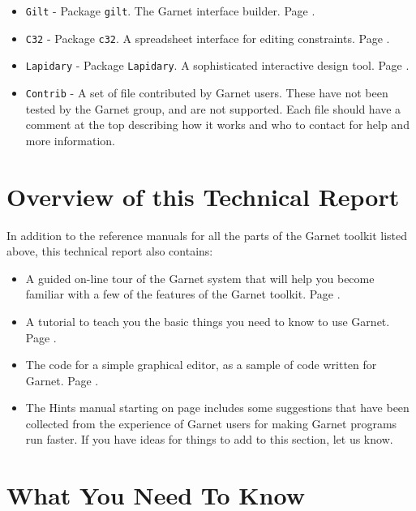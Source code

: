 \documentclass{report}
\begin{document}
\begin{itemize}
\item \texttt{Gilt} - Package \texttt{gilt}.  The Garnet
  interface builder.  Page \pageref{gilt}.
  
\item \texttt{C32} - Package \texttt{c32}.  A spreadsheet interface for
  editing constraints.  Page \pageref{c32}.
  
\item \texttt{Lapidary} - Package \texttt{Lapidary}.  A sophisticated interactive design tool.  Page
  \pageref{lapidary}.
  
\item \texttt{Contrib} - A set of file contributed by Garnet users.  These
  have not been tested by the Garnet group, and are not supported.
  Each file should have a comment at the top describing how it works
  and who to contact for help and more information.
\end{itemize}

\section{Overview of this Technical Report}

In addition to the reference manuals for all the parts of the Garnet
toolkit listed above, this technical report also contains:
\begin{itemize}
\item A guided on-line tour of the Garnet system that will help you
  become familiar with a few of the features of the Garnet toolkit.
  Page \pageref{tour}.
  
\item A tutorial to teach you the basic things you need to know to use
  Garnet.  Page \pageref{tutorial}.
  
\item The code for a simple graphical editor, as a sample of code
  written for Garnet.  Page \pageref{sampleprog}.
  
\item The Hints manual starting on page \pageref{hints} includes some
  suggestions that have been collected from the experience of Garnet
  users for making Garnet programs run faster.  If you have ideas for
  things to add to this section, let us know.
\end{itemize}

\section{What You Need To Know}
\end{document}
